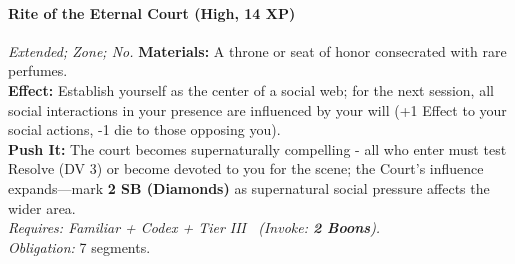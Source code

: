 \paragraph{Rite of the Eternal Court (High, 14 XP)} \emph{Extended; Zone; No.}
\textbf{Materials:} A throne or seat of honor consecrated with rare perfumes. \\
\textbf{Effect:} Establish yourself as the center of a social web; for the next session, all social interactions in your presence are influenced by your will (+1 Effect to your social actions, -1 die to those opposing you). \\
\textbf{Push It:} The court becomes supernaturally compelling - all who enter must test Resolve (DV 3) or become devoted to you for the scene; the Court's influence expands—mark \textbf{2 SB (Diamonds)} as supernatural social pressure affects the wider area. \\
\emph{Requires: Familiar + Codex + Tier III \ (\textit{Invoke:} \textbf{2 Boons}).} \\
\emph{Obligation:} 7 segments.